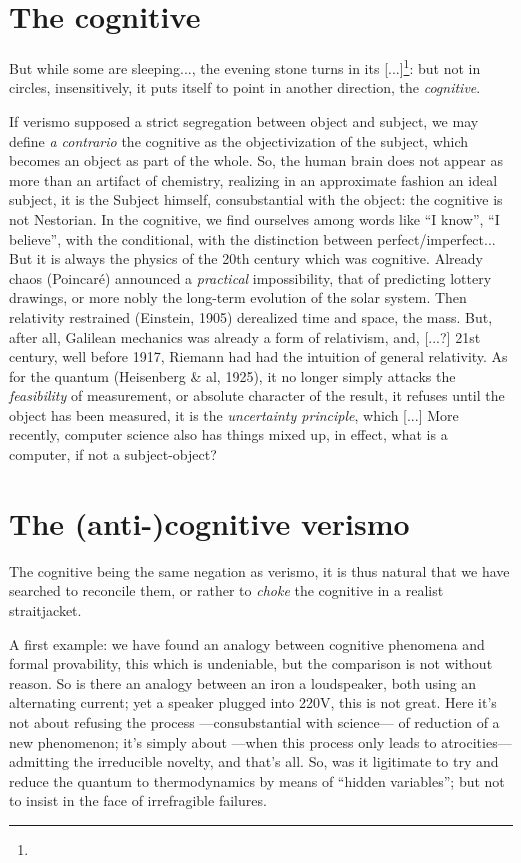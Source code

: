 \documentclass{article}
\begin{document}
\section{The cognitive}
But while some are sleeping..., the evening stone turns in its [...]\footnote{}: but not in circles, insensitively, it puts itself to point in another direction, the \emph{cognitive}.

If verismo supposed a strict segregation between object and subject, we may define \emph{a contrario} the cognitive as the objectivization of the subject, which becomes an object as part of the whole. So, the human brain does not appear as more than an artifact of chemistry, realizing in an approximate fashion an ideal subject, it is the Subject himself, consubstantial with the object: the cognitive is not Nestorian. In the cognitive, we find ourselves among words like \enquote{I know}, \enquote{I believe}, with the conditional, with the distinction between perfect/imperfect... But it is always the physics of the 20th century which was cognitive. Already chaos (Poincaré) announced a \emph{practical} impossibility, that of predicting lottery drawings, or more nobly the long-term evolution of the solar system. Then relativity restrained (Einstein, 1905) derealized time and space, the mass. But, after all, Galilean mechanics was already a form of relativism, and, [...?] 21st century, well before 1917, Riemann had had the intuition of general relativity. As for the quantum (Heisenberg \& al, 1925), it no longer simply attacks the \emph{feasibility} of measurement, or absolute character of the result, it refuses until the object has been measured, it is the \emph{uncertainty principle}, which [...] More recently, computer science also has things mixed up, in effect, what is a computer, if not a subject-object?

\section{The (anti-)cognitive verismo}
The cognitive being the same negation as verismo, it is thus natural that we have searched to reconcile them, or rather to \emph{choke} the cognitive in a realist straitjacket.

A first example: we have found an analogy between cognitive phenomena and formal provability, this which is undeniable, but the comparison is not without reason. So is there an analogy between an iron a loudspeaker, both using an alternating current; yet a speaker plugged into 220V, this is not great. Here it's not about refusing the process ---consubstantial with science--- of reduction of a new phenomenon; it's simply about ---when this process only leads to atrocities--- admitting the irreducible novelty, and that's all. So, was it ligitimate to try and reduce the quantum to thermodynamics by means of \enquote{hidden variables}; but not to insist in the face of irrefragible failures.
\end{document}
